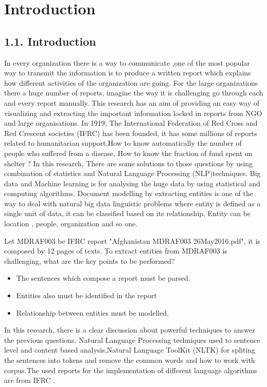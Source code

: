 \chapter{Introduction}
\section*{1.1. Introduction}
In every organization there is a way to communicate ,one of the most popular way to transmit the information  is  to produce a written report which explains how different activities of the organization are going. For the large organizations there a huge number of reports, imagine the way it is challenging go through  each and every report manually.
This research has an aim of providing an easy way of visualizing and extracting the important information locked in reports from NGO and large organisations.
In 1919, The International Federation of Red Cross and Red Crescent societies (IFRC) has been founded, it has some millions of reports related to humanitarian support,How to  know automatically the number of people who suffered from a disease, How to know the  fraction of fund spent on shelter ?  In this research, There are some solutions to those questions by using combination of statistics and Natural Language Processing (NLP)techniques.
Big data and Machine learning is for analysing the huge data by using statistical and computing algorithms. Document modelling by extracting entities is one of the way to deal with natural big data linguistic problems where entity is defined as a single unit of data, it can be classified based on its relationship, Entity can be location , people, organization and so one.


Let MDRAF003 be IFRC report "Afghanistan MDRAF003 26May2016.pdf", it is composed by 12 pages of texts.
To extract entities  from MDRAF003 is challenging, what are the key points to be performed?
\begin{itemize}
\item The sentences which compose a report  must be parsed.
\item  Entities also must be identified in the report
\item Relationship between entities must be modelled.
\end{itemize}
In this research, there is a clear discussion about powerful techniques to answer the previous questions.  Natural  Language Processing techniques used to sentence level and content based analysis,Natural Language ToolKit  (NLTK) for spliting the sentences into tokens and remove the common words and how to work with corpus.The used reports for the implementation of different language algorithms are from IFRC .


